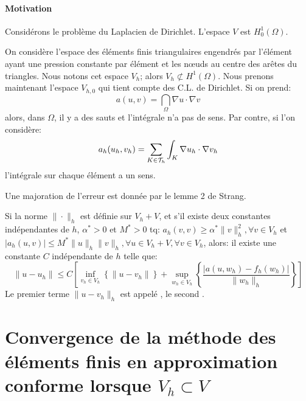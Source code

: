 \medskip
\paragraph{Motivation}
Considérons le problème du Laplacien de Dirichlet.
L'espace $V$ est $H^1_0(\Omega)$.

On considère l'espace des éléments finis triangulaires engendrés par l'élément
ayant une pression constante par élément et les nœuds au centre des arêtes du
triangles. Nous notons cet espace $V_h$; alors $V_h\not\subset H^1(\Omega)$.
Nous prenons maintenant l'espace $V_{h,0}$ qui tient compte des C.L. de Dirichlet.
Si on prend:
\begin{equation}a(u,v)=\dint_\Omega \nabla u\cdot \nabla v\end{equation} alors, dans $\Omega$, il y a
des sauts et l'intégrale n'a pas de sens.
Par contre, si l'on considère:
\begin{equation} a_h(u_h,v_h)=\displaystyle\sum_{K\in\mathcal{T}_h}\displaystyle\int_K \nabla u_h\cdot\nabla v_h\end{equation}
l'intégrale sur chaque élément a un sens.

\medskip
Une majoration de l'erreur est donnée par le lemme 2 de Strang.
\begin{lemme}
Si la norme $\|\cdot\|_h$ est définie sur $V_h+V$,
et s'il existe deux constantes indépendantes de $h$, $\alpha^*>0$ et $M^*>0$ tq:
$a_h(v,v)\ge\alpha^*\|v\|^2_h, \forall v\in V_h$ et
$|a_h(u,v)|\le M^*\|u\|_h\|v\|_h, \forall u\in V_h+V, \forall v\in V_h$,
alors: il existe une constante $C$ indépendante de $h$ telle que:
\begin{equation}
\|u-u_h\|\le C\left[
\inf_{v_h\in V_h} \left\{ \|u-v_h\|\right\} +
\sup_{w_h\in V_h} \left\{\dfrac{|a(u,w_h)-f_h(w_h)|}{\|w_h\|_h}\right\}
\right]
\end{equation}
Le premier terme $ \|u-v_h\|_h$ est appelé ,
le second .
\end{lemme}



\medskip
\section[Convergence de la méthode des éléments finis en approximation conforme]{Convergence de la méthode des éléments finis en approximation conforme lorsque $V_h\subset V$}

